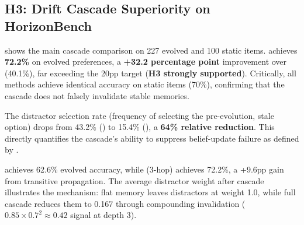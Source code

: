 \begin{table}[t]
\centering
\caption{Semantic bridge approach comparison on the 19-pair conflict benchmark (11 true conflicts, 8 non-conflicts). LLM inference achieves 100\% precision, solving the semantic bridging problem. Embedding similarity achieves high recall but low precision due to the permissive 0.3 cosine distance threshold.}
\label{tab:semantic_bridge}
\end{table}

\subsection{H3: Drift Cascade Superiority on HorizonBench}
\label{sec:results:horizon}

 shows the main cascade comparison on 227 evolved and 100 static \horizonbench items. \fullcascade achieves \textbf{72.2\%} on evolved preferences, a \textbf{+32.2 percentage point} improvement over \flatmemory (40.1\%), far exceeding the 20pp target (\textbf{H3 strongly supported}). Critically, all methods achieve identical accuracy on static items (70\%), confirming that the cascade does not falsely invalidate stable memories.

The distractor selection rate (frequency of selecting the pre-evolution, stale option) drops from 43.2\% (\flatmemory) to 15.4\% (\fullcascade), a \textbf{64\% relative reduction}. This directly quantifies the cascade's ability to suppress belief-update failure as defined by \citet{li2026horizonbench}.

\onehop achieves 62.6\% evolved accuracy, while \fullcascade (3-hop) achieves 72.2\%, a +9.6pp gain from transitive propagation. The average distractor weight after cascade illustrates the mechanism: flat memory leaves distractors at weight 1.0, while full cascade reduces them to 0.167 through compounding invalidation ($0.85 \times 0.7^2 \approx 0.42$ signal at depth 3).

